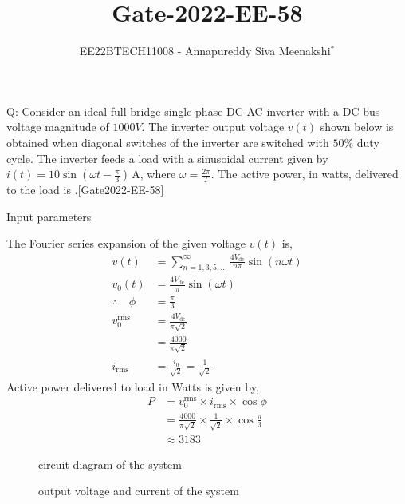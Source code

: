 \documentclass[journal,12pt,onecolumn]{IEEEtran}
\theoremstyle{remark}
\begin{document}

\vspace{3cm}

\title{Gate-2022-EE-58}
\author{EE22BTECH11008 - Annapureddy Siva Meenakshi$^{*}$}
\maketitle
\bigskip

\renewcommand{\thefigure}{\theenumi}
\renewcommand{\thetable}{\theenumi}
Q: Consider an ideal full-bridge single-phase DC-AC inverter with a DC bus voltage magnitude of $1000 V$. The inverter output voltage $v(t)$ shown below is obtained when diagonal switches of the inverter are switched with $50\%$ duty cycle. The inverter feeds a load with a sinusoidal current given by $i(t) = 10 \sin(\omega t - \frac{\pi}{3}) \, \mathrm{A}$, where $\omega=\frac{2\pi}{T}$. The active power, in watts, delivered to the load is \underline{\quad}.[Gate2022-EE-58]  \\     
\begin{figure}[htb]
  \centering
  
  \label{fig:EE_58_f1}
\end{figure}
   

\solution

\begin{table}[!ht]
    \centering
        
    \caption{Input parameters}
    \label{tab:EE_58_t1}
\end{table}

The Fourier series expansion of the given voltage $v(t)$ is,
\begin{align}
  v(t) &= \sum_{n=1,3,5,\ldots}^{\infty} \frac{4V_{\text{dc}}}{n\pi} \sin(n\omega t)\\
    v_{0}(t)&=  \frac{4V_{\text{dc}}}{\pi} \sin(\omega t)\\
    \therefore \quad \phi &= \frac{\pi}{3}\\
    v_{0}^{\text{rms}}&=  \frac{4V_{\text{dc}}}{\pi \sqrt{2}}\\
    &=\frac{4000}{\pi \sqrt{2}}\\
    i_{\text{rms}}&=\frac{i_{0}}{\sqrt{2}}=\frac{1}{\sqrt{2}}
\end{align}
  Active power delivered to load in Watts is given by,
  \begin{align}
    P &= v_{0}^{\text{rms}} \times i_{\text{rms}} \times \cos{\phi}\\
    &= \frac{4000}{\pi \sqrt{2}} \times \frac{1}{\sqrt{2}} \times \cos{\frac{\pi}{3}}\\
    &\approx 3183 
\end{align}
\begin{figure}[htb]
  \centering
  
   \captionsetup{justification=centering, singlelinecheck=off}
  \caption{circuit diagram of the system}
  \label{fig:EE_58_f2}
\end{figure}
\begin{figure}[htb]
  \centering
  
   \captionsetup{justification=centering, singlelinecheck=off}
  \caption{output voltage and current of the system}
  \label{fig:EE_58_f3}
\end{figure}
\end{document}
